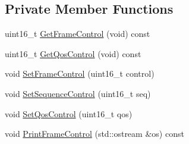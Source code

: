 \subsection*{Private Member Functions}
\begin{DoxyCompactItemize}
\item 
uint16\+\_\+t \hyperlink{classns3_1_1WifiMacHeader_a8528031b4811577ed7b6e379f683180b}{Get\+Frame\+Control} (void) const 
\item 
uint16\+\_\+t \hyperlink{classns3_1_1WifiMacHeader_a628f7e4538618029c9f88a77686650ed}{Get\+Qos\+Control} (void) const 
\item 
void \hyperlink{classns3_1_1WifiMacHeader_a2728816a86edf15a508771de4b7a0dcb}{Set\+Frame\+Control} (uint16\+\_\+t control)
\item 
void \hyperlink{classns3_1_1WifiMacHeader_a6802f8b595a9d537ebb686d729d6fc7f}{Set\+Sequence\+Control} (uint16\+\_\+t seq)
\item 
void \hyperlink{classns3_1_1WifiMacHeader_a50c549e2cd3b5a70eaafa2deb51a1f0e}{Set\+Qos\+Control} (uint16\+\_\+t qos)
\item 
void \hyperlink{classns3_1_1WifiMacHeader_ab0a49be8ed03287c89d128b4c0f1a09f}{Print\+Frame\+Control} (std\+::ostream \&os) const 
\end{DoxyCompactItemize}
